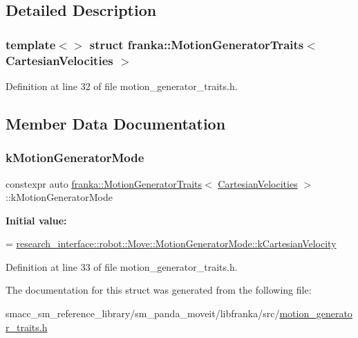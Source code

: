 \subsection{Detailed Description}
\subsubsection*{template$<$$>$\newline
struct franka\+::\+Motion\+Generator\+Traits$<$ Cartesian\+Velocities $>$}



Definition at line 32 of file motion\+\_\+generator\+\_\+traits.\+h.



\subsection{Member Data Documentation}
\mbox{\label{structfranka_1_1MotionGeneratorTraits_3_01CartesianVelocities_01_4_ae95b58e391e5052219e2ea0506a76851}} 
\subsubsection{\texorpdfstring{k\+Motion\+Generator\+Mode}{kMotionGeneratorMode}}
{\footnotesize\ttfamily constexpr auto \hyperlink{structfranka_1_1MotionGeneratorTraits}{franka\+::\+Motion\+Generator\+Traits}$<$ \hyperlink{classfranka_1_1CartesianVelocities}{Cartesian\+Velocities} $>$\+::k\+Motion\+Generator\+Mode\hspace{0.3cm}{\ttfamily [static]}}

{\bfseries Initial value\+:}
\begin{DoxyCode}
=
      \hyperlink{structresearch__interface_1_1robot_1_1Move_a334b8380507154e8042b57fbd3287c0fad42e39826eabd261aa1d29c15be8e433}{research\_interface::robot::Move::MotionGeneratorMode::kCartesianVelocity}
\end{DoxyCode}


Definition at line 33 of file motion\+\_\+generator\+\_\+traits.\+h.



The documentation for this struct was generated from the following file\+:\begin{DoxyCompactItemize}
\item 
smacc\+\_\+sm\+\_\+reference\+\_\+library/sm\+\_\+panda\+\_\+moveit/libfranka/src/\hyperlink{motion__generator__traits_8h}{motion\+\_\+generator\+\_\+traits.\+h}\end{DoxyCompactItemize}
